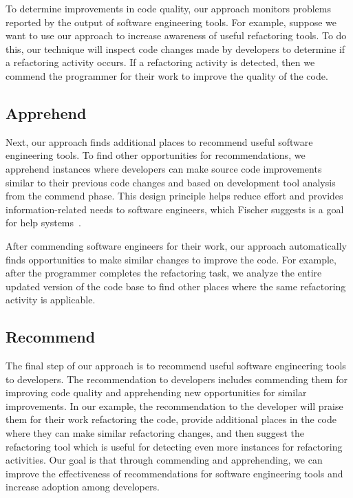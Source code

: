 \documentclass[sigconf,review,anonymous]{acmart}
\newcommand{\tool}{\textsl{tool-recommender-bot}}
\begin{document}
To determine improvements in code quality, our approach monitors problems reported by the output of software engineering tools. For example, suppose we want to use our approach to increase awareness of useful refactoring tools. To do this, our technique will inspect code changes made by developers to determine if a refactoring activity occurs. If a refactoring activity is detected, then we commend the programmer for their work to improve the quality of the code.


\subsection{Apprehend}

Next, our approach finds additional places to recommend useful software engineering tools. To find other opportunities for recommendations, we apprehend instances where developers can make source code improvements similar to their previous code changes and based on development tool analysis from the commend phase. This design principle helps reduce effort and provides information-related needs to software engineers, which Fischer suggests is a goal for help systems~\cite{Fischer1984ActiveHelpSystems}. 

After commending software engineers for their work, our approach automatically finds opportunities to make similar changes to improve the code. For example, after the programmer completes the refactoring task, we analyze the entire updated version of the code base to find other places where the same refactoring activity is applicable. 


\subsection{Recommend}

The final step of our approach is to recommend useful software engineering tools to developers. The recommendation to developers includes commending them for improving code quality and apprehending new opportunities for similar improvements. In our example, the recommendation to the developer will praise them for their work refactoring the code, provide additional places in the code where they can make similar refactoring changes, and then suggest the refactoring tool which is useful for detecting even more instances for refactoring activities. Our goal is that through commending and apprehending, we can improve the effectiveness of recommendations for software engineering tools and increase adoption among developers.
\end{document}
